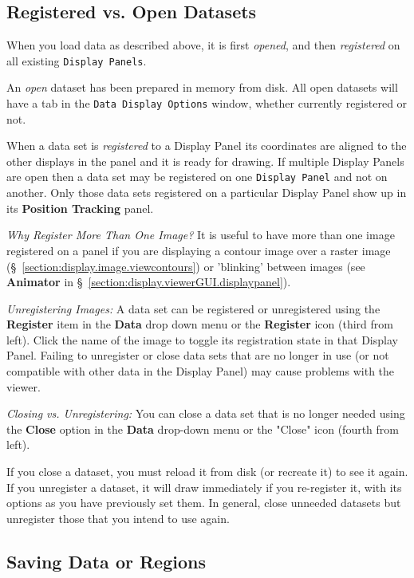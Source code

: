 \subsection{Registered vs. Open Datasets}
\label{section:display.viewerGUI.load.register}

When you load data as described above, it is first {\em opened}, and then
{\em registered} on all existing {\tt Display Panels}.  

An {\em open} dataset has been prepared in memory from disk.  All open datasets will 
have a tab in the {\tt Data Display Options} window, whether currently registered or not.  

When a data set is {\em registered} to a Display Panel its coordinates are aligned to
the other displays in the panel and it is ready for drawing. If multiple Display Panels are open
then a data set may be registered on one {\tt Display Panel} and not on another. Only those
data sets registered on a particular Display Panel show up in its {\bf Position Tracking}
panel.

{\em Why Register More Than One Image?} It is useful to have more than one image registered on a
panel if you are displaying a contour image over a raster image
(\S~\ref{section:display.image.viewcontours}) or 'blinking' between images
(see {\bf Animator} in \S~\ref{section:display.viewerGUI.displaypanel}).

{\em Unregistering Images:} A data set can be registered or unregistered using the {\bf Register}
item in the {\bf Data} drop down menu or the {\bf Register} icon (third from left). Click the name of the image to
toggle its registration state in that Display Panel. Failing to unregister or close data sets that are 
no longer in use (or not compatible with other data in the Display Panel) may cause problems with 
the viewer. 

{\em Closing vs. Unregistering:} You can close a data set that is no longer needed using the {\bf Close}
option in the {\bf Data} drop-down menu or the "Close" icon (fourth from left). 

If you close a dataset, you must reload it from disk (or recreate it) to see it again.  If you
unregister a dataset, it will draw immediately if you re-register it, with its options as you have 
previously set them.  In general, close unneeded datasets but unregister those that you intend to use again.

\subsection{Saving Data or Regions}
\label{section:display.viewerGUI.save}

